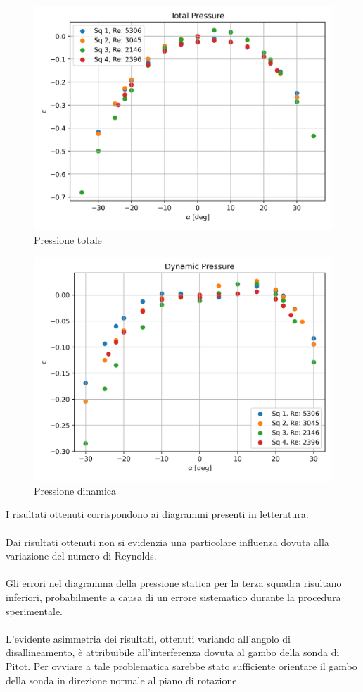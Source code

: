 \begin{figure}[h!]
    \centering
    \includegraphics[width=.76\textwidth]{images/2/ptot.png}
    \caption{Pressione totale}
\end{figure}

\newpage
\begin{figure}[ht]
    \centering
    \includegraphics[width=.76\textwidth]{images/2/q.png}
    \caption{Pressione dinamica}
\end{figure}

\noindent I risultati ottenuti corrispondono ai diagrammi presenti in letteratura.\\\\
Dai risultati ottenuti non si evidenzia una particolare influenza dovuta alla variazione del numero di Reynolds.\\\\
Gli errori nel diagramma della pressione statica per la terza squadra risultano inferiori, probabilmente a causa di un errore sistematico durante la procedura sperimentale.\\\\
L'evidente asimmetria dei risultati, ottenuti variando all'angolo di disallineamento, è attribuibile all'interferenza dovuta al gambo della sonda di Pitot. Per ovviare a tale problematica sarebbe stato sufficiente orientare il gambo della sonda in direzione normale al piano di rotazione.

